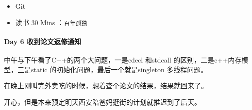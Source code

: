 \documentclass[UTF8,a4paper,8pt]{ctexart}
\begin{document}
		\begin{itemize}[itemindent = 1em]
			\renewcommand\labelitemi{\makebox[0pt][l]{$\square$}\raisebox{.15ex}{\hspace{0.1em}$\checkmark$}}		
			\item   Git	
			\renewcommand\labelitemi{\makebox[0pt][l]{$\square$}\hspace{1em}}
			\item   读书  30 Mins	：\verb|百年孤独|
			
		\end{itemize}
	\paragraph{Day 6   收到论文返修通知    \quad     }
		中午与下午看了C++的两个大问题，一是cdecl 和stdcall  的区别，二是c++内存模型，三是static 的初始化问题，最后一个就是singleton 多线程问题。
		
		在晚上刚叫完外卖吃的时候，想着查个论文的结果，结果就回来了。
		
		开心，但是本来预定明天西安陪爸妈逛街的计划就推迟到了后天。
		
\end{document}
